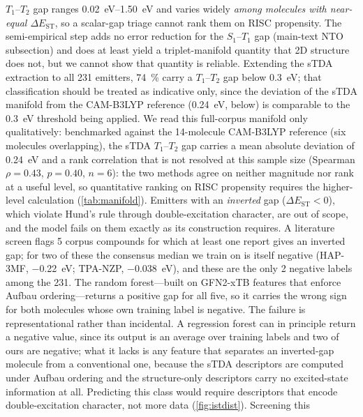 \documentclass[final,3p,times,twocolumn]{elsarticle}
\begin{document}
$T_1$--$T_2$ gap ranges \qtyrange{0.02}{1.50}{\electronvolt} and varies widely
\emph{among molecules with near-equal $\Delta E_\text{ST}$}, so a scalar-gap triage
cannot rank them on RISC propensity. The semi-empirical step adds no error reduction for the
$S_1$--$T_1$ gap (main-text NTO subsection) and does at least yield a triplet-manifold
quantity that 2D structure does not, but we cannot show that quantity is reliable.
Extending the sTDA extraction to all \num{231} emitters, \qty{74}{\percent} carry a
$T_1$--$T_2$ gap below \qty{0.3}{\electronvolt}; that classification should be treated
as indicative only, since the deviation of the sTDA manifold from the CAM-B3LYP reference
(\qty{0.24}{\electronvolt}, below) is comparable to the \qty{0.3}{\electronvolt}
threshold being applied.
We read this full-corpus manifold only qualitatively: benchmarked against the
\num{14}-molecule CAM-B3LYP reference (six molecules overlapping), the sTDA $T_1$--$T_2$
gap carries a mean absolute deviation of \qty{0.24}{\electronvolt} and a rank
correlation that is not resolved at this sample size (Spearman $\rho = 0.43$,
$p = 0.40$, $n = 6$): the two methods agree on neither magnitude nor rank at a useful
level, so quantitative ranking on RISC propensity requires the higher-level calculation
(\cref{tab:manifold}). Emitters with an \emph{inverted} gap ($\Delta E_\text{ST}<0$), which violate
Hund's rule through double-excitation character,\cite{Veglianti2025} are out of
scope, and the model fails on them exactly as its construction requires. A literature
screen flags \num{5} corpus compounds for which at least one report gives an inverted
gap; for two of these the consensus median we train on is itself negative
(HAP-3MF, \qty{-0.22}{\electronvolt}; TPA-NZP, \qty{-0.038}{\electronvolt}), and these
are the only \num{2} negative labels among the \num{231}. The random forest---built on
GFN2-xTB features that enforce Aufbau ordering---returns a positive gap for all five, so
it carries the wrong sign for both molecules whose own training label is negative. The failure is representational rather than incidental. A regression forest can in
principle return a negative value, since its output is an average over training labels and
two of ours are negative; what it lacks is any feature that separates an inverted-gap
molecule from a conventional one, because the sTDA descriptors are computed under Aufbau
ordering and the structure-only descriptors carry no excited-state information at all.
Predicting this class would require descriptors that encode double-excitation character,
not more data (\cref{fig:istdist}). Screening this
\end{document}
